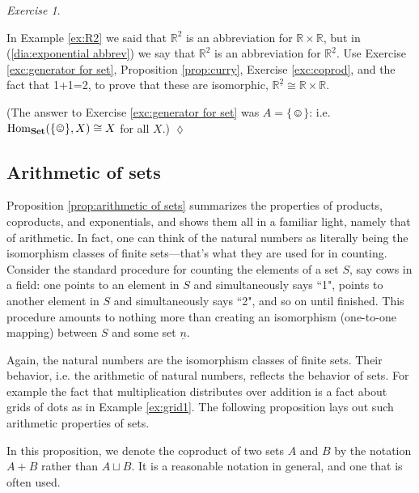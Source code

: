 \documentclass{book}
\def\tn{\textnormal}
\def\RR{{\mathbb R}}
\def\Hom{\tn{Hom}}
\def\singleton{\{\smiley\}}
\def\iso{\cong}
\def\ul{\underline}
\def\Set{{\bf Set}}
\theoremstyle{remark}
\newtheorem{exc}[subsubsection]{Exercise}
\newenvironment{exercise}{\begin{exc}}{\hspace*{\fill}$\lozenge$\end{exc}}
\theoremstyle{definition}
\begin{document}
\begin{exercise}\label{exc:two R2s}

In Example \ref{ex:R2} we said that $\RR^2$ is an abbreviation for $\RR\times\RR$, but in (\ref{dia:exponential abbrev}) we say that $\RR^2$ is an abbreviation for $\RR^{\ul{2}}$. Use Exercise \ref{exc:generator for set}, Proposition \ref{prop:curry}, Exercise \ref{exc:coprod}, and the fact that 1+1=2, to prove that these are isomorphic, $\RR^{\ul{2}}\iso\RR\times\RR$.

(The answer to Exercise \ref{exc:generator for set} was $A=\singleton$: i.e. $\Hom_\Set(\singleton,X)\iso X$ for all $X$.)
\end{exercise}


\subsection{Arithmetic of sets}\label{sec:arithmetic of sets}

Proposition \ref{prop:arithmetic of sets} summarizes the properties of products, coproducts, and exponentials, and shows them all in a familiar light, namely that of arithmetic. In fact, one can think of the natural numbers as literally being the isomorphism classes of finite sets---that's what they are used for in counting. Consider the standard procedure for counting the elements of a set $S$, say cows in a field: one points to an element in $S$ and simultaneously says ``1", points to another element in $S$ and simultaneously says ``2", and so on until finished. This procedure amounts to nothing more than creating an isomorphism (one-to-one mapping) between $S$ and some set $\ul{n}$. 

Again, the natural numbers are the isomorphism classes of finite sets. Their behavior, i.e. the arithmetic of natural numbers, reflects the behavior of sets. For example the fact that multiplication distributes over addition is a fact about grids of dots as in Example \ref{ex:grid1}. The following proposition lays out such arithmetic properties of sets.

In this proposition, we denote the coproduct of two sets $A$ and $B$ by the notation $A+B$ rather than $A\sqcup B$. It is a reasonable notation in general, and one that is often used. 
\end{document}
